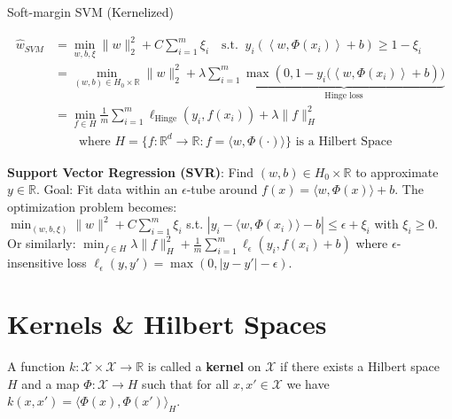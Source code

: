 \documentclass[a4paper,10pt]{article}
\def\R{\mathbb{R}}
\begin{document}
\begin{small}
\begin{subbox}{Soft-margin SVM (Kernelized)}
    \begin{footnotesize}
    \begin{align*}
        \hat{w}_{SVM} &=
    \min_{w,b,\xi} 
    \| w \|_2^2 + C \sum_{i=1}^{m} \xi_i  \quad 
    \text{s.t. }  \ y_i \left( \left\langle w, \Phi(x_i) \right\rangle + b \right) \geq 1 - \xi_i \\
    &= \min_{(w,b) \in H_0 \times \R} 
    \| w \|_2^2 + \lambda \sum_{i=1}^{m} \underbrace{\max \left( 0, 1-  y_i ( \left\langle w, \Phi(x_i) \right\rangle + b \right ) )}_{\text{Hinge loss}} \\
    &= \min_{f \in H} \frac{1}{m} \sum_{i=1}^{m} \ell_{\text{Hinge}}(y_i, f(x_i)) + \lambda \|f\|_H^2 \\
    & 
    {\scriptstyle
    \quad \quad \text{where } H = \{f : \R^d \to \R : f = \langle w, \Phi(\cdot) \rangle \} \text{ is a Hilbert Space}}
    \end{align*}
    \end{footnotesize}
\end{subbox}

\textbf{Support Vector Regression (SVR)}:
Find $ (w, b) \in H_0 \times \mathbb{R} $ to approximate $ y \in \mathbb{R} $. Goal: Fit data within an $ \epsilon $-tube around $ f(x) = \langle w, \Phi(x) \rangle + b $.
The optimization problem becomes: \\
$ 
\min_{(w,b,\xi)} \|w\|^2 + C \sum_{i=1}^{m} \xi_i
$
s.t. $ |y_i - \langle w, \Phi(x_i) \rangle - b| \leq \epsilon + \xi_i$ with $\xi_i \geq 0 $.
Or similarly:
$
\min_{f \in H} \lambda \|f\|_H^2 + \frac{1}{m} \sum_{i=1}^{m} \ell_{\epsilon}(y_i, f(x_i)+b) 
$
where $ \epsilon $-insensitive loss $ \ell_\epsilon(y, y') = \max(0, |y - y'| - \epsilon) $.

\newpage

\section{Kernels \& Hilbert Spaces}

\begin{subbox_noTitle}
    A function $k : \mathcal{X} \times \mathcal{X} \to \mathbb{R}$ is called a \textbf{kernel} on $\mathcal{X}$ if there exists a Hilbert space $H$ and a map $\Phi : \mathcal{X} \to H$ such that for all $x, x' \in \mathcal{X}$ we have $k(x, x') = \langle \Phi(x), \Phi(x') \rangle_H$.
\end{subbox_noTitle}


\end{small}
\end{document}
